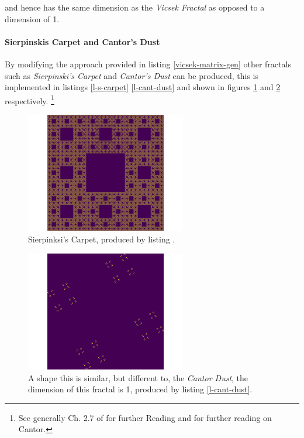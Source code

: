 \documentclass[a4paper,11pt,twoside]{article}
\begin{document}
and hence has the same dimension as the \emph{Vicsek Fractal} as opposed to a
dimension of 1.

\paragraph{Sierpinskis Carpet and Cantor's Dust}
\label{sec:orgcee1fed}
By modifying the approach provided in listing \ref{vicsek-matrix-gen} other fractals
such as \emph{Sierpinski's Carpet} and \emph{Cantor's Dust} can be produced, this is
implemented in listings \ref{l-s-carpet} \ref{l-cant-dust} and shown in figures
\ref{fig:square-carpet} and \ref{fig:cantor-dust} respectively. \footnote{See generally Ch. 2.7 of \cite[\S 2.7]{peitgenChaosFractalsNew2004} for further Reading and \cite[p. 79]{mandelbrotFractalGeometryNature1982} for further reading on Cantor.}

\begin{figure}[htbp]
\centering
\includegraphics[width=7cm]{media/sierpinsky_carpet.png}
\caption{\label{fig:square-carpet}Sierpinksi's Carpet, produced by listing .}
\end{figure}


\begin{figure}[htbp]
\centering
\includegraphics[width=7cm]{media/Cantor_Dust_gen.png}
\caption{\label{fig:cantor-dust}A shape this is similar, but different to, the \emph{Cantor Dust}, the dimension of this fractal is 1, produced by listing \ref{l-cant-dust}.}
\end{figure}
\end{document}
